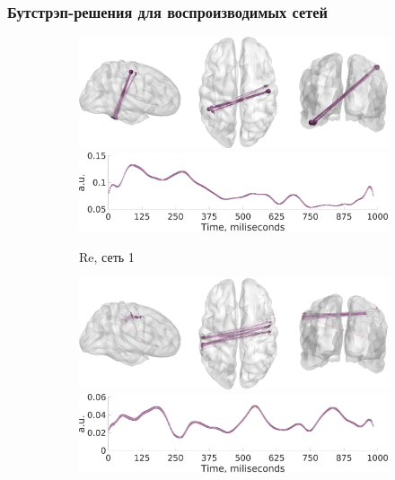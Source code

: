 \documentclass[12pt]{beamer}
\begin{document}
\begin{frame}[t]
    \frametitle{Бутстрэп-решения для воспроизводимых сетей}
    
    \begin{figure}
    \centering

     \begin{subfigure}[b]{0.4\textwidth}
     \includegraphics[width=\textwidth]{../images/psiicos_paper/Figure12_a1.jpg}
     \includegraphics[width=\textwidth]{../images/psiicos_paper/Figure12_a2.jpg}
     \caption{Re, сеть 1}\label{fig:12a}
     \end{subfigure}
     \hspace{1cm}
     \begin{subfigure}[b]{0.4\textwidth}
     \includegraphics[width=\textwidth]{../images/psiicos_paper/Figure12_b1.jpg}
     \includegraphics[width=\textwidth]{../images/psiicos_paper/Figure12_b2.jpg}

\end{subfigure}
\end{figure}
\end{frame}
\end{document}
